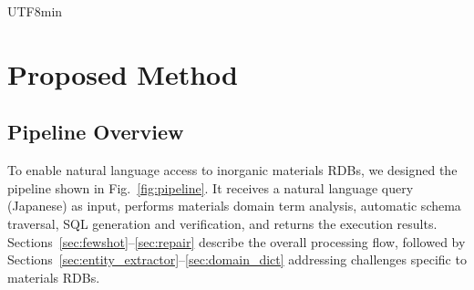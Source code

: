 \documentclass[sn-mathphys,Numbered]{sn-jnl}
\begin{document}
\begin{CJK}{UTF8}{min}
\section{Proposed Method}
\label{sec:method}

\subsection{Pipeline Overview}

To enable natural language access to inorganic materials RDBs,
we designed the pipeline shown in Fig.~\ref{fig:pipeline}.
It receives a natural language query (Japanese) as input,
performs materials domain term analysis, automatic schema traversal,
SQL generation and verification, and returns the execution results.
Sections~\ref{sec:fewshot}--\ref{sec:repair} describe the overall processing flow,
followed by Sections~\ref{sec:entity_extractor}--\ref{sec:domain_dict}
addressing challenges specific to materials RDBs.

\begin{figure}[htbp]
\centering
{}
\end{figure}
\end{CJK}
\end{document}
